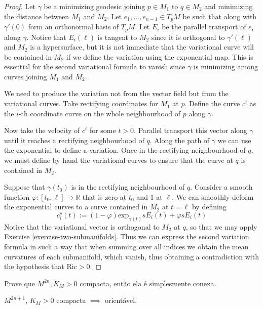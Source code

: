 \begin{proof}
Let $\gamma$ be a minimizing geodesic joining $p \in M_1$ to $q\in M_2$ and
minimizing the distance between $M_1$ and $M_2$. Let $e_1,\ldots,e_{n-1}\in
T_pM$ be such that along with $\gamma'(0)$ form an orthonormal basis of $T_pM$.
Let $E_i$ be the parallel transport of $e_i$ along $\gamma$. Notice that
$E_i(\ell)$ is tangent to $M_2$ since it is orthogonal to $\gamma'(\ell)$ and
$M_2$ is a hypersurface, but it is not immediate that the variational curve will
be contained in $M_2$ if we define the variation using the exponential map. This
is essential for the second variational formula to vanish since $\gamma$ is
minimizing among curves joining $M_1$ and $M_2$.

We need to produce the variation not from the vector field but from the
variational curves. Take rectifying coordinates for $M_1$ at $p$. Define the
curve $c^i$ as the $i$-th coordinate curve on the whole neighbourhood of $p$
along $\gamma$.

Now take the velocity of $c^i$ for some $t>0$. Parallel transport this vector
along $\gamma$ until it reaches a rectifying neighbourhood of $q$. Along the
path of $\gamma$ we can use the exponential to define a variation. Once in the
rectifying neighbourhood of $q$, we must define by hand the variational curves
to ensure that the curve at $q$ is contained in $M_2$.

Suppose that $\gamma(t_0)$ is in the rectifying neighbourhood of $q$. Consider a
smooth function $\varphi:[t_0,\ell]\to \mathbb{R}$ that is zero at $t_0$ and $1$
at $\ell$. We can smoothly deform the exponential curves to a curve contained in
$M_2$ at $t=\ell$ by defining 
$$
c^s_i(t):=(1-\varphi)\text{exp}_{\gamma(t)}sE_i(t)+\varphi sE_i(t)
$$ 
Notice that the variational vector is orthogonal to $M_2$ at $q$, so that we may
apply Exercise \ref{exercise-two-submanifolds}. Thus we can express the second
variation formula in such a way that when summing over all indices we obtain the
mean curvatures of each submanifold, which vanish, thus obtaining a
contradiction with the hypothesis that $\text{Ric}>0$.
\end{proof}

\begin{exercise}
\label{exercise-even-dimension-positive-K-compact-is-simply-connected}
Prove que $M^{2n},K_M>0$ compacta, então ela é simplesmente conexa.
\end{exercise}

\begin{exercise}
\label{exercise-odd-dimension-positive-K-is-orientable}
$M^{2n+1}$, $K_M>0$ compacta $\implies$ orientável.
\end{exercise}

